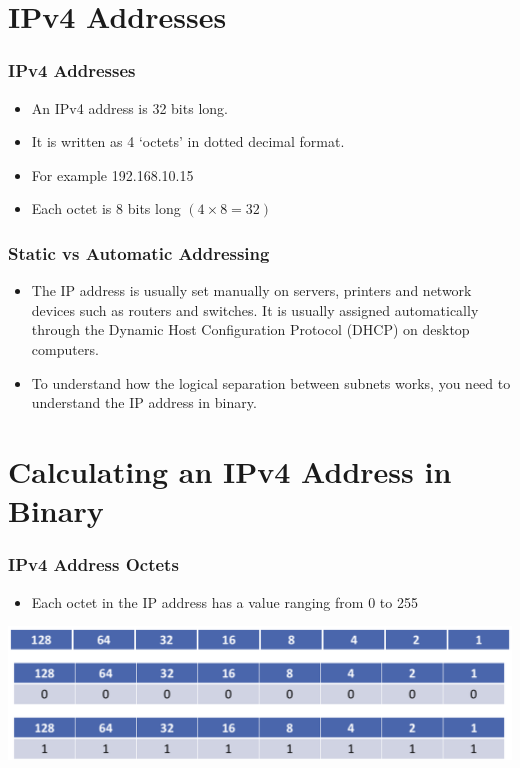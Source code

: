 \documentclass[pdflatex,compress]{beamer}
\begin{document}
\section{IPv4 Addresses}

\begin{frame}
	\frametitle{IPv4 Addresses}
	\begin{itemize}
		\item An IPv4 address is 32 bits long.
		\item It is written as 4 ‘octets’ in dotted decimal format.
		\item For example 192.168.10.15
		\item Each octet is 8 bits long $ (4 \times 8 = 32) $
	\end{itemize}	
\end{frame}

\begin{frame}
	\frametitle{Static vs Automatic Addressing}
	\begin{itemize}
		\item The IP address is usually set manually on servers, printers and network devices such as routers and switches. It is usually assigned automatically through the Dynamic Host Configuration Protocol (DHCP) on desktop computers.
		\item To understand how the logical separation between subnets works, you need to understand the IP address in binary.
	\end{itemize}	
\end{frame}

\section{Calculating an IPv4 Address in Binary}

\begin{frame}
	\frametitle{IPv4 Address Octets}
	\begin{itemize}
		\item Each octet in the IP address has a value ranging from 0 to 255
	\end{itemize}
	\begin{center}
		\includegraphics[width=0.9\linewidth]{img/img19}
	\end{center}
\end{frame}
\end{document}
